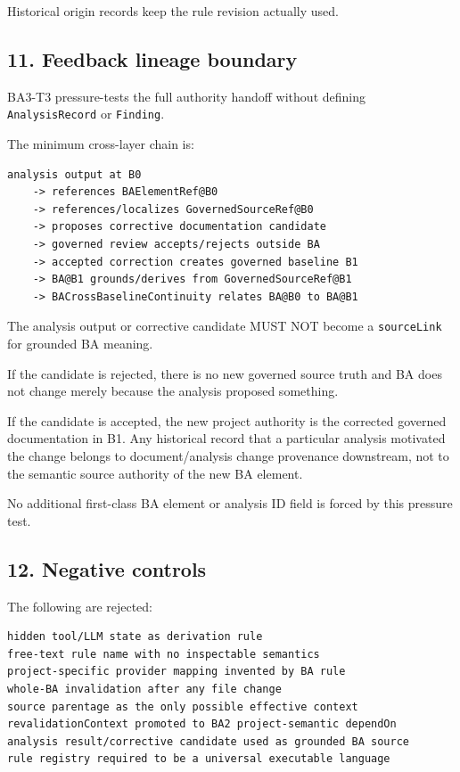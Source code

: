 \documentclass[11pt,a4paper]{article}
\begin{document}
Historical origin records keep the rule revision actually used.

\subsection{11. Feedback lineage
boundary}\label{feedback-lineage-boundary}

BA3-T3 pressure-tests the full authority handoff without defining
\texttt{AnalysisRecord} or \texttt{Finding}.

The minimum cross-layer chain is:

\begin{verbatim}
analysis output at B0
    -> references BAElementRef@B0
    -> references/localizes GovernedSourceRef@B0
    -> proposes corrective documentation candidate
    -> governed review accepts/rejects outside BA
    -> accepted correction creates governed baseline B1
    -> BA@B1 grounds/derives from GovernedSourceRef@B1
    -> BACrossBaselineContinuity relates BA@B0 to BA@B1
\end{verbatim}

The analysis output or corrective candidate MUST NOT become a
\texttt{sourceLink} for grounded BA meaning.

If the candidate is rejected, there is no new governed source truth and
BA does not change merely because the analysis proposed something.

If the candidate is accepted, the new project authority is the corrected
governed documentation in B1. Any historical record that a particular
analysis motivated the change belongs to document/analysis change
provenance downstream, not to the semantic source authority of the new
BA element.

No additional first-class BA element or analysis ID field is forced by
this pressure test.

\subsection{12. Negative controls}\label{negative-controls}

The following are rejected:

\begin{verbatim}
hidden tool/LLM state as derivation rule
free-text rule name with no inspectable semantics
project-specific provider mapping invented by BA rule
whole-BA invalidation after any file change
source parentage as the only possible effective context
revalidationContext promoted to BA2 project-semantic dependOn
analysis result/corrective candidate used as grounded BA source
rule registry required to be a universal executable language
\end{verbatim}
\end{document}
